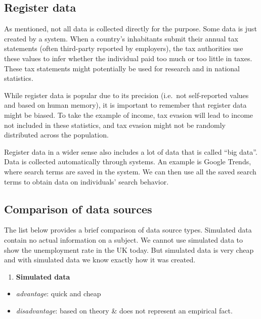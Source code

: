 \documentclass[
]{book}
\providecommand{\tightlist}{%
  \setlength{\itemsep}{0pt}\setlength{\parskip}{0pt}}
\begin{document}
\hypertarget{register-data}{%
\subsection*{Register data}\label{register-data}}

As mentioned, not all data is collected directly for the purpose. Some data is just created by a system. When a country's inhabitants submit their annual tax statements (often third-party reported by employers), the tax authorities use these values to infer whether the individual paid too much or too little in taxes. These tax statements might potentially be used for research and in national statistics.

While register data is popular due to its precision (i.e.~not self-reported values and based on human memory), it is important to remember that register data might be biased. To take the example of income, tax evasion will lead to income not included in these statistics, and tax evasion might not be randomly distributed across the population.

Register data in a wider sense also includes a lot of data that is called ``big data''. Data is collected automatically through systems. An example is Google Trends, where search terms are saved in the system. We can then use all the saved search terms to obtain data on individuals' search behavior.

\hypertarget{comparison-of-data-sources}{%
\subsection*{Comparison of data sources}\label{comparison-of-data-sources}}

The list below provides a brief comparison of data source types. Simulated data contain no actual information on a subject. We cannot use simulated data to show the unemployment rate in the UK today. But simulated data is very cheap and with simulated data we know exactly how it was created.

\begin{enumerate}
\def\labelenumi{\arabic{enumi}.}
\tightlist
\item
  \textbf{Simulated data}
\end{enumerate}

\begin{itemize}
\tightlist
\item
  \emph{advantage}: quick and cheap
\item
  \emph{disadvantage}: based on theory \& does not represent an empirical fact.
\end{itemize}
\end{document}

